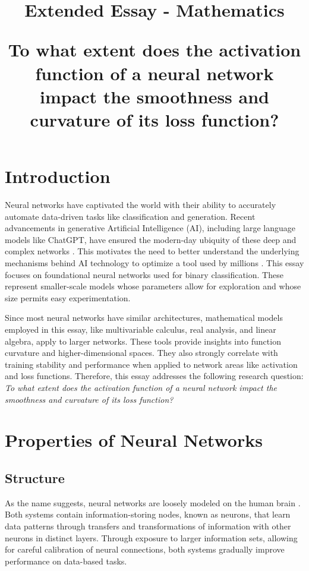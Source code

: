 \documentclass{article}
\title{Extended Essay - Mathematics \\[1ex] 
\author{} 
\large To what extent does the activation function of a neural network impact the smoothness and curvature of its loss function?}
\date{}
\theoremstyle{definition}
\begin{document}
\maketitle
\clearpage
\tableofcontents
\clearpage
\section{Introduction}
Neural networks have captivated the world with their ability to accurately automate data-driven tasks like classification and generation. Recent advancements in generative Artificial Intelligence (AI), including large language models like ChatGPT, have ensured the modern-day ubiquity of these deep and complex networks \cite{nature_deep_learning}. This motivates the need to better understand the underlying mechanisms behind AI technology to optimize a tool used by millions  \cite{ai_usage_stats}. This essay focuses on foundational neural networks used for binary classification. These represent smaller-scale models whose parameters allow for exploration and whose size permits easy experimentation.


Since most neural networks have similar architectures, mathematical models employed in this essay, like multivariable calculus, real analysis, and linear algebra, apply to larger networks. These tools provide insights into function curvature and higher-dimensional spaces. They also strongly correlate with training stability and performance when applied to network areas like activation and loss functions. Therefore, this essay addresses the following research question: \textit{To what extent does the activation function of a neural network impact the smoothness and curvature of its loss function?}

\section{Properties of Neural Networks}
\subsection{Structure}

As the name suggests, neural networks are loosely modeled on the human brain \cite{ai_bio}. Both systems contain information-storing nodes, known as neurons, that learn data patterns through transfers and transformations of information with other neurons in distinct layers. Through exposure to larger information sets, allowing for careful calibration of neural connections, both systems gradually improve performance on data-based tasks.
\end{document}
